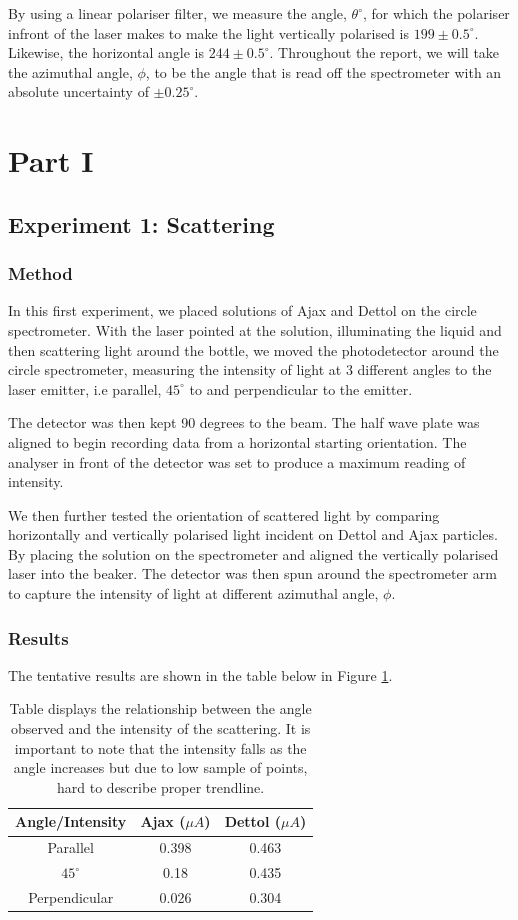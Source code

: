 \documentclass{article}
\begin{document}
By using a linear polariser filter, we measure the angle, $\theta^\circ$,
for which the polariser infront of the laser makes to make the light 
vertically polarised is $199 \pm 0.5 ^\circ$. Likewise, the horizontal angle is 
$244 \pm 0.5^\circ$. Throughout the report, we will take the azimuthal angle, $\phi$, 
to be the angle that is read off the spectrometer with an absolute uncertainty of 
$\pm 0.25^\circ$.

\section{Part I}
\subsection{Experiment 1: Scattering}
\subsubsection{Method}
In this first experiment, we placed solutions of Ajax and Dettol 
on the circle spectrometer. With the laser pointed at the solution,
illuminating the liquid and then scattering light around the bottle,
we moved the photodetector around the circle spectrometer, measuring 
the intensity of light at 3 different angles to the laser emitter, 
i.e parallel, $45^\circ$ to and perpendicular to the 
emitter. 

The detector was then kept 90 degrees to the beam. The half wave plate 
was aligned to begin recording data from a horizontal starting orientation.
The analyser in front of the detector was set to produce a maximum reading 
of intensity.

We then further tested the orientation of scattered light by comparing 
horizontally and vertically polarised light incident on Dettol and Ajax 
particles. By placing the solution on the spectrometer and aligned the 
vertically polarised laser into the beaker. The detector was then spun
around the spectrometer arm to capture the intensity of light at different 
azimuthal angle, $\phi$. 


\subsubsection{Results}
The tentative results are shown in the table below in Figure \ref{tab:table}.

\begin{table}[htbp]
    \centering
      \begin{tabular}{|c|c|c|}
      Angle/Intensity & Ajax ($\mu A$) & Dettol ($\mu A$) \\
      \hline
      Parallel & 0.398 & 0.463 \\
      $45^\circ$ & 0.18  & 0.435 \\
      Perpendicular & 0.026 & 0.304 \\
      \end{tabular}
    \caption{Table displays the relationship between the angle 
    observed and the intensity of the scattering. It is important
    to note that the intensity falls as the angle increases but due 
    to low sample of points, hard to describe proper trendline.}
    \label{tab:table}
\end{table}
\end{document}
